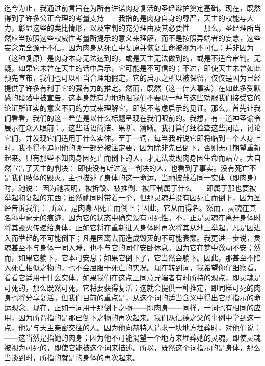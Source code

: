 迄今为止，我通过前言旨在为所有许诺肉身复活的圣经辩护奠定基础。现在，既然得到了许多公正合理的考量支持——我指的是肉身自身的尊严，天主的权能与大力，彰显这些的类比情形，以及审判的充分理由及其必要性——那么，圣经理所当然应当按照这些权威性考量所提示的意义来理解，而不是按照异端者的妄念，这些妄念完全源于不信，因为肉身从死亡中复原并恢复生命被视为不可信；并非因为（这种复原）是肉身本身无法达到的，或是天主无法做到的，或是不适合审判。无疑，如果它未曾在天主的话中启示，它可能是不可信的；不过，即使天主未曾如此预先宣布，我们也可以相当合理地假定，它的启示之所以被保留，仅仅是因为已经提供了许多有利于它的强有力的推定。然而，既然（这一伟大事实）在如此多受默感的段落中被宣告，这本身就有力地劝阻我们不要以一种与这些劝服我们接受它的论证所证实的意义不同的方式来理解它，即使不考虑启示的见证。那么，首先让我们看看，我们的这一希望是以什么标题呈现在我们眼前的。我想，有一道神圣谕令展示在众人眼前：。这些话语简洁、果断、清晰。我打算仔细检查这些词语，讨论它们，并发现它们适用于什么实体。至于一词，每当我听说它即将临到一个人身上时，我不得不追问他的哪一部分被注定要，因为除非先已倒下，否则无可期望重新起来。只有那些不知肉身因死亡而倒下的人，才无法发现肉身因生命而站立。大自然宣告了天主的判决： 即使没有听过这一判决的人，也看到了事实。没有死亡不是我们肢体的毁灭。主也描述了身体的这一命运，当祂披戴着同一实体（即肉身）时，祂说： 因为祂表明，被拆毁、被推倒、被压制属于什么——即属于那也要被举起和复起的东西；虽然祂同时带着一个，但那灵魂并没有因死亡而倒下，因为圣经告诉我们： 所以，是肉身因死亡而倒下；因此，它从而得名。然而，灵魂在其名称中毫无的痕迹，因为它的状态中确实没有可死性。不，正是灵魂在离开身体时将其毁灭传递给身体，正如它将在重新进入身体时再次将其从地上举起。凡是因进入而举起的不可能倒下；凡是因离去而造成毁灭的不可能衰颓。我更进一步说，灵魂甚至不与身体一同入睡，也不与它的同伴安卧休息。因为它在梦中激动不安；然而，如果它躺下，它本可安息；如果它倒下了，它当然会躺下。因此，那甚至不陷入死亡相似之物的，也不会屈服于死亡的实况。现在转到词，我希望你仔细察看，看看它适用于什么实体。如果我们在这点上同意异端者有时所持的观点，即灵魂是可死的，那么既然可死，它将要获得复活；这就会提供一种推定，即同样可死的肉身也将分享复活。但我们目前的重点是，从这个词的适当含义中得出它所指示的命运观念。现在，正如一词用于那倒下之物——即肉身——同样，一词也有相同的应用，因为所谓指的是那已倒下之物的再次起来。我们从信德之父的事例中学到这一点，他是与天主亲密交往的人。因为他向赫特人请求一块地方埋葬时，对他们说：——这当然是指她的肉身；因为他不可能渴望一个地方来埋葬她的灵魂，即使灵魂被视为可死的，即使它能被这个词来描述。所以，既然这个词指示的是身体，那么当谈到时，所指的就是的身体的再次起来。\par


